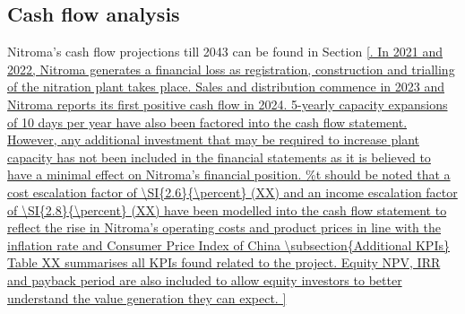 \subsection{Cash flow analysis}
\label{sec:cash-flows}
Nitroma’s cash flow projections till 2043 can be found in Section \ref{. In 2021 and 2022, Nitroma generates a financial loss as registration, construction and trialling of the nitration plant takes place. Sales and distribution commence in 2023 and Nitroma reports its first positive cash flow in 2024. 5-yearly capacity expansions of 10 days per year have also been factored into the cash flow statement. However, any additional investment that may be required to increase plant capacity has not been included in the financial statements as it is believed to have a minimal effect on Nitroma’s financial position.

\subsection{Additional KPIs}
Table XX summarises all KPIs found related to the project. Equity NPV, IRR and payback period are also included to allow equity investors to better understand the value generation they can expect. 

}
